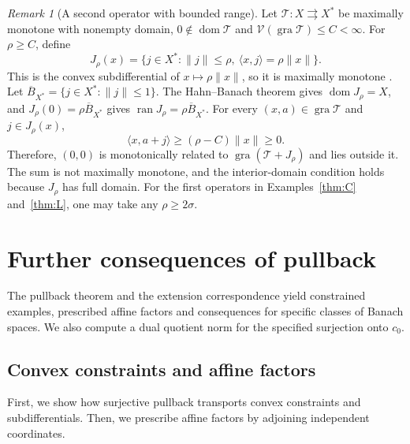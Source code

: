 \documentclass[11pt]{article}
\newcommand{\gra}{\operatorname{gra}}
\newcommand{\dom}{\operatorname{dom}}
\newcommand{\pair}[2]{\langle #1,#2\rangle}
\theoremstyle{definition}
\theoremstyle{remark}
\newtheorem{remark}{Remark}
\begin{document}
\begin{remark}[A second operator with bounded range]
\label{rem:bounded-range-partner}
Let $\mathcal T:X\rightrightarrows X^*$ be maximally monotone with nonempty domain, $0\notin\dom\mathcal T$ and $\mathcal V(\gra\mathcal T)\le C<\infty$. For $\rho\ge C$, define
\[
J_\rho(x)=
\{j\in X^*:\|j\|\le\rho,\ \pair{x}{j}=\rho\|x\|\}.
\]
This is the convex subdifferential of $x\mapsto\rho\|x\|$, so it is maximally monotone \cite{rockafellar1970subdiff}. Let $\overline B_{X^*}=\{j\in X^*:\|j\|\le1\}$. The Hahn--Banach theorem gives $\dom J_\rho=X$, and $J_\rho(0)=\rho\overline B_{X^*}$ gives $\operatorname{ran}J_\rho=\rho\overline B_{X^*}$. For every $(x,a)\in\gra\mathcal T$ and $j\in J_\rho(x)$,
\[
\pair{x}{a+j}\ge(\rho-C)\|x\|\ge0.
\]
Therefore, $(0,0)$ is monotonically related to $\gra(\mathcal T+J_\rho)$ and lies outside it. The sum is not maximally monotone, and the interior-domain condition holds because $J_\rho$ has full domain. For the first operators in Examples~\ref{thm:C} and~\ref{thm:L}, one may take any $\rho\ge2\sigma$.
\end{remark}

\section{Further consequences of pullback}
\label{app:pullback}

The pullback theorem and the extension correspondence yield constrained examples, prescribed affine factors and consequences for specific classes of Banach spaces. We also compute a dual quotient norm for the specified surjection onto $c_0$.

\subsection{Convex constraints and affine factors}
\label{subsec:appendix-affine-transfer}

First, we show how surjective pullback transports convex constraints and subdifferentials. Then, we prescribe affine factors by adjoining independent coordinates.
\end{document}
